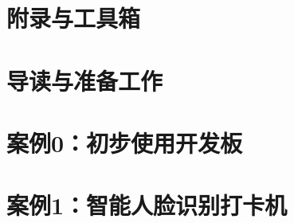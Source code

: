 \documentclass[fontsize=12pt, paper=a4, oneside, DIV=calc]{scrbook}
\theoremstyle{break}
\begin{document}
\chapter{附录与工具箱}


\chapter{导读与准备工作}


\chapter{案例0：初步使用开发板}


\chapter{案例1：智能人脸识别打卡机}





\end{document}

